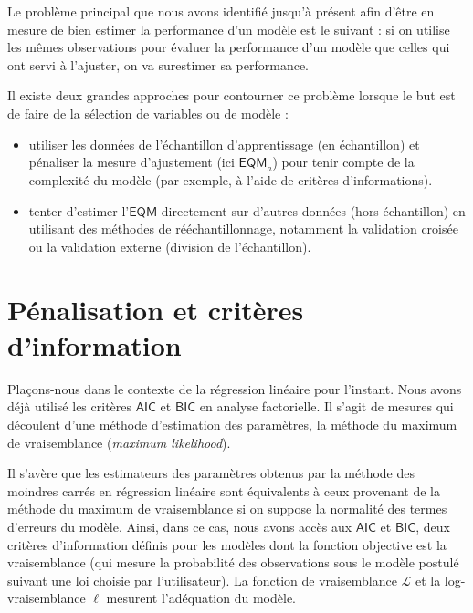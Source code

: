 \documentclass[
  11pt,
  letterpaper,
]{book}
\providecommand{\tightlist}{%
  \setlength{\itemsep}{0pt}\setlength{\parskip}{0pt}}
\theoremstyle{definition}
\theoremstyle{definition}
\theoremstyle{definition}
\theoremstyle{definition}
\theoremstyle{remark}
\begin{document}
Le problème principal que nous avons identifié jusqu'à présent afin d'être en mesure de bien estimer la performance d'un modèle est le suivant : si on utilise les mêmes observations pour évaluer la performance d'un modèle que celles qui ont servi à l'ajuster, on va surestimer sa performance.

Il existe deux grandes approches pour contourner ce problème lorsque le but est de faire de la sélection de variables ou de modèle :

\begin{itemize}
\tightlist
\item
  utiliser les données de l'échantillon d'apprentissage (en échantillon) et pénaliser la mesure d'ajustement (ici \(\widehat{\mathsf{EQM}}_a\)) pour tenir compte de la complexité du modèle (par exemple, à l'aide de critères d'informations).
\item
  tenter d'estimer l'\(\mathsf{EQM}\) directement sur d'autres données (hors échantillon) en utilisant des méthodes de rééchantillonnage, notamment la validation croisée ou la validation externe (division de l'échantillon).
\end{itemize}

\hypertarget{puxe9nalisation-et-crituxe8res-dinformation}{%
\section{Pénalisation et critères d'information}\label{puxe9nalisation-et-crituxe8res-dinformation}}

Plaçons-nous dans le contexte de la régression linéaire pour l'instant.
Nous avons déjà utilisé les critères \(\mathsf{AIC}\) et \(\mathsf{BIC}\) en analyse factorielle. Il s'agit de mesures qui découlent d'une méthode d'estimation des paramètres, la méthode du maximum de vraisemblance (\emph{maximum likelihood}).

Il s'avère que les estimateurs des paramètres obtenus par la méthode des moindres carrés en régression linéaire sont équivalents à ceux provenant de la méthode du maximum de vraisemblance si on suppose la normalité des termes d'erreurs du modèle. Ainsi, dans ce cas, nous avons accès aux \(\mathsf{AIC}\) et \(\mathsf{BIC}\), deux critères d'information définis pour les modèles dont la fonction objective est la vraisemblance (qui mesure la probabilité des observations sous le modèle postulé suivant une loi choisie par l'utilisateur). La fonction de vraisemblance \(\mathcal{L}\) et la log-vraisemblance \(\ell\) mesurent l'adéquation du modèle.
\end{document}

